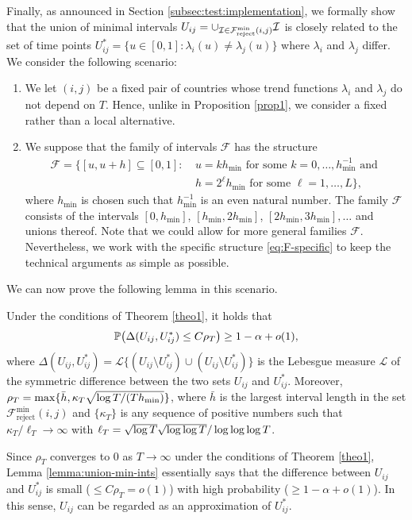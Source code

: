 \documentclass[a4paper,12pt]{article}
\numberwithin{equation}{section}
\begin{document}
{\color{red}
Finally, as announced in Section \ref{subsec:test:implementation}, we formally show that the union of minimal intervals $U_{ij} = \cup_{\mathcal{I} \in \mathcal{F}_{\text{reject}}^{\text{min}}(i,j)} \mathcal{I}$ is closely related to the set of time points $U_{ij}^* = \{ u \in [0,1]: \lambda_i(u) \ne \lambda_j(u) \}$ where $\lambda_i$ and $\lambda_j$ differ. We consider the following scenario: 
\begin{enumerate}[label=(\alph*),leftmargin=0.75cm]
\item We let $(i,j)$ be a fixed pair of countries whose trend functions $\lambda_i$ and $\lambda_j$ do not depend on $T$. Hence, unlike in Proposition \ref{prop1}, we consider a fixed rather than a local alternative. 
\item We suppose that the family of intervals $\mathcal{F}$ has the structure
\begin{align} 
\mathcal{F} = \big\{ [u, u + h] \subseteq [0,1]: \ & u = k h_{\min} \text{ for some } k=0,\ldots,h_{\min}^{-1} \text{ and } \nonumber \\
 & h = 2^\ell h_{\min} \text{ for some } \ell = 1,\ldots,L \big\}, \label{eq:F-specific}
\end{align}
where $h_{\min}$ is chosen such that $h_{\min}^{-1}$ is an even natural number. The family $\mathcal{F}$ consists of the intervals $[0,h_{\min}]$, $[h_{\min}, 2h_{\min}]$, $[2h_{\min}, 3h_{\min}], \ldots$ and unions thereof. Note that we could allow for more general families $\mathcal{F}$. Nevertheless, we work with the specific structure \eqref{eq:F-specific} to keep the technical arguments as simple as possible. 
\end{enumerate}
We can now prove the following lemma in this scenario.
\begin{lemmaS}\label{lemma:union-min-ints}
Under the conditions of Theorem \ref{theo1}, it holds that 
\begin{equation*}
\mathbb{P} \big( \Delta(U_{ij}, U_{ij}^*) \le C \rho_T \big) \ge 1-\alpha + o(1), 
\end{equation*}
where $\Delta(U_{ij},U_{ij}^*) = \mathcal{L} \{(U_{ij} \setminus U_{ij}^*) \cup (U_{ij} \setminus U_{ij}^*)\}$ is the Lebesgue measure $\mathcal{L}$ of the symmetric difference between the two sets $U_{ij}$ and $U_{ij}^*$. Moreover, $\rho_T = \max \{ \bar{h}, \kappa_T \linebreak \sqrt{\log T / (T h_{\min})} \}$, where $\bar{h}$ is the largest interval length in the set $\mathcal{F}_{\text{reject}}^{\text{min}}(i,j)$ and $\{\kappa_T\}$ is any sequence of positive numbers such that $\kappa_T / \ell_T \to \infty$ with $\ell_T = \sqrt{\log T} \linebreak \sqrt{\log \log T} / \log \log \log T$. 
\end{lemmaS}
\noindent Since $\rho_T$ converges to $0$ as $T \to \infty$ under the conditions of Theorem \ref{theo1}, Lemma \ref{lemma:union-min-ints} essentially says that the difference between $U_{ij}$ and $U_{ij}^*$ is small ($\le C\rho_T = o(1)$) with high probability ($\ge 1 -\alpha + o(1)$). In this sense, $U_{ij}$ can be regarded as an approximation of $U_{ij}^*$. 


}
\end{document}

